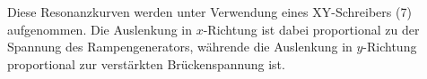 Diese Resonanzkurven werden unter Verwendung eines XY-Schreibers (7) aufgenommen. 
Die Auslenkung in $x$-Richtung ist dabei proportional zu der Spannung des Rampengenerators, währende die Auslenkung in $y$-Richtung  
proportional zur verstärkten Brückenspannung ist.     
 
